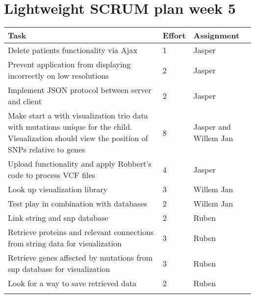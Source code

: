 \documentclass[a4paper]{report}
\begin{document}


\section*{Lightweight SCRUM plan week 5}

\setlength\extrarowheight{5pt}
\begin{table}[ht]
\begin{tabular}{p{8cm}|p{2cm}|p{3cm}}

\textbf{Task} & \textbf{Effort} & \textbf{Assignment}\\
\hline \hline

Delete patients functionality via Ajax & 1 & Jasper\\
Prevent application from displaying incorrectly on low resolutions & 2 & Jasper\\
Implement JSON protocol between server and client & 2 & Jasper\\
Make start a with visualization trio data with mutations unique for the child. Visualization should view the position of SNPs relative to genes & 8 & Jasper and Willem Jan\\
Upload functionality and apply Robbert's code to process VCF files & 4 & Jasper\\
Look up visualization library & 3 & Willem Jan\\
Test play in combination with databases & 2 & Willem Jan\\
Link string and snp database & 2 & Ruben\\
Retrieve proteins and relevant connections from string data for visualization & 3 & Ruben\\
Retrieve genes affected by mutations from snp database for visualization & 3 & Ruben\\
Look for a way to save retrieved data & 2 & Ruben\\

\vspace{10pt} & \vspace{10pt} & \vspace{10pt}\\

\end{tabular}
\end{table}
\end{document}
